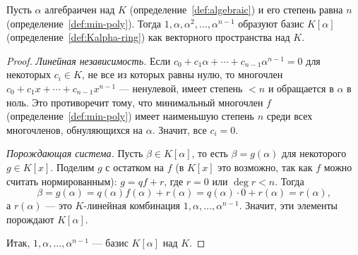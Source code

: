 \documentclass[12pt]{article}
\begin{document}
    \begin{theorem}\label{thm:basis}
    	Пусть $\alpha$ алгебраичен над $K$ (определение~\ref{def:algebraic}) и его степень равна $n$ (определение~\ref{def:min-poly}). Тогда $1, \alpha, \alpha^2, \ldots, \alpha^{n-1}$ образуют базис $K[\alpha]$ (определение~\ref{def:Kalpha-ring}) как векторного пространства над $K$.
    \end{theorem}
    \begin{proof}
    	\emph{Линейная независимость.} Если $c_0 + c_1\alpha + \cdots + c_{n-1}\alpha^{n-1} = 0$ для некоторых $c_i \in K$, не все из которых равны нулю, то многочлен $c_0 + c_1x + \cdots + c_{n-1}x^{n-1}$ --- ненулевой, имеет степень $<n$ и обращается в $\alpha$ в ноль. Это противоречит тому, что минимальный многочлен $f$ (определение~\ref{def:min-poly}) имеет наименьшую степень $n$ среди всех многочленов, обнуляющихся на $\alpha$. Значит, все $c_i = 0$.
    
    	\emph{Порождающая система.} Пусть $\beta \in K[\alpha]$, то есть $\beta = g(\alpha)$ для некоторого $g \in K[x]$. Поделим $g$ с остатком на $f$ (в $K[x]$ это возможно, так как $f$ можно считать нормированным): $g = qf + r$, где $r = 0$ или $\deg r < n$. Тогда
    	\[
    	\beta = g(\alpha) = q(\alpha)f(\alpha) + r(\alpha) = q(\alpha)\cdot 0 + r(\alpha) = r(\alpha),
    	\]
    	а $r(\alpha)$ --- это $K$-линейная комбинация $1, \alpha, \ldots, \alpha^{n-1}$. Значит, эти элементы порождают $K[\alpha]$.
    
    	Итак, $1, \alpha, \ldots, \alpha^{n-1}$ --- базис $K[\alpha]$ над $K$.
    \end{proof}
    
\end{document}
